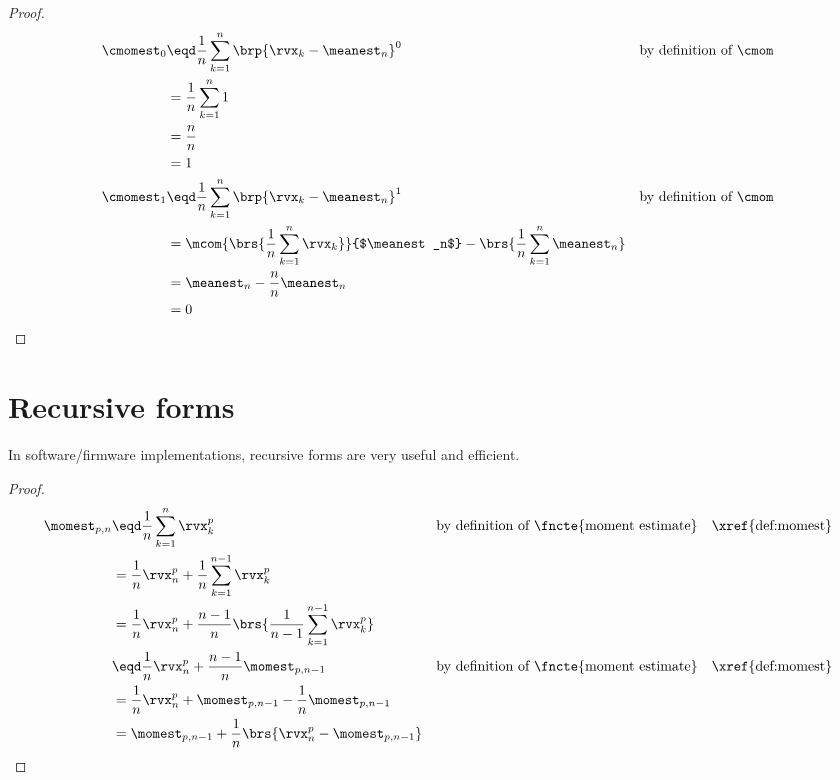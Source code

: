 \begin{proposition}
\label{prop:cMom01}

\end{proposition}
\begin{proof}
\begin{align*}
  \cmomest_0
    &\eqd \frac{1}{n} \sum_{k=1}^{n} \brp{ \rvx_k - \meanest_n }^0
    && \text{by definition of $\cmom$}
  \\&=  \frac{1}{n} \sum_{k=1}^{n} 1
  \\&=  \frac{n}{n}
  \\&=  1
  \\
  \cmomest_1
    &\eqd \frac{1}{n} \sum_{k=1}^{n} \brp{ \rvx_k - \meanest_n }^1
    && \text{by definition of $\cmom$}
  \\&= \mcom{\brs{\frac{1}{n} \sum_{k=1}^{n} \rvx_k}}{$\meanest_n$} - \brs{\frac{1}{n} \sum_{k=1}^{n} \meanest_n }
  \\&= \meanest_n - \frac{n}{n} \meanest_n
  \\&= 0
\end{align*}
\end{proof}
\section{Recursive forms}
In software/firmware implementations, recursive forms are very useful and efficient.
\begin{theorem}
\label{thm:moment_recursive}
\end{theorem}
\begin{proof}
\begin{align*}
  \momest_{p,n}
    &\eqd \frac{1}{n} \sum_{k=1}^{n} \rvx_k^p
    && \text{by definition of \fncte{moment estimate}}
    && \text{\xref{def:momest}}
  \\&= \frac{1}{n}\rvx_n^p + \frac{1}{n} \sum_{k=1}^{n-1} \rvx_k^p
  \\&= \frac{1}{n}\rvx_n^p + \frac{n-1}{n}\brs{\frac{1}{n-1} \sum_{k=1}^{n-1} \rvx_k^p }
  \\&\eqd \frac{1}{n}\rvx_n^p + \frac{n-1}{n}\momest_{p,n-1}
    && \text{by definition of \fncte{moment estimate}}
    && \text{\xref{def:momest}}
  \\&= \frac{1}{n}\rvx_n^p + \momest_{p,n-1} - \frac{1}{n}\momest_{p,n-1}
  \\&= \momest_{p,n-1} + \frac{1}{n} \brs{\rvx_n^p - \momest_{p,n-1}}
\end{align*}
\end{proof}

